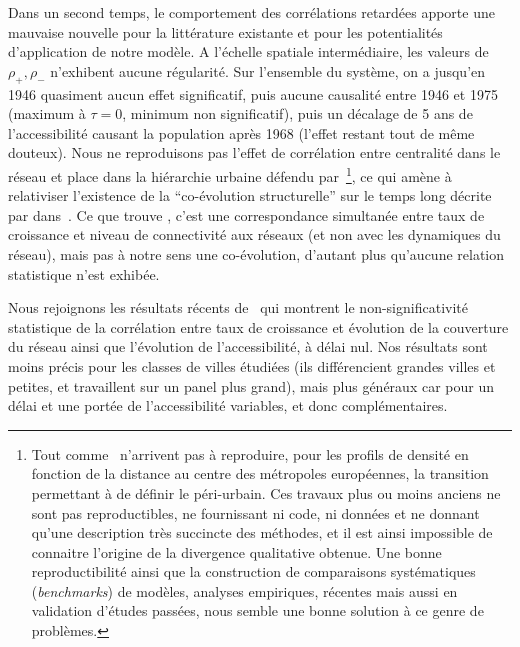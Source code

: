 Dans un second temps, le comportement des corrélations retardées apporte une mauvaise nouvelle pour la littérature existante et pour les potentialités d'application de notre modèle. A l'échelle spatiale intermédiaire, les valeurs de $\rho_+,\rho_-$ n'exhibent aucune régularité. Sur l'ensemble du système, on a jusqu'en 1946 quasiment aucun effet significatif, puis aucune causalité entre 1946 et 1975 (maximum à $\tau = 0$, minimum non significatif), puis un décalage de 5 ans de l'accessibilité causant la population après 1968 (l'effet restant tout de même douteux). Nous ne reproduisons pas l'effet de corrélation entre centralité dans le réseau et place dans la hiérarchie urbaine défendu par~\cite{bretagnolle2003vitesse}\footnote{Tout comme~\cite{lemoy2017scaling} n'arrivent pas à reproduire, pour les profils de densité en fonction de la distance au centre des métropoles européennes, la transition permettant à \cite{guerois2008built} de définir le péri-urbain. Ces travaux plus ou moins anciens ne sont pas reproductibles, ne fournissant ni code, ni données et ne donnant qu'une description très succincte des méthodes, et il est ainsi impossible de connaitre l'origine de la divergence qualitative obtenue. Une bonne reproductibilité ainsi que la construction de comparaisons systématiques (\emph{benchmarks}) de modèles, analyses empiriques, récentes mais aussi en validation d'études passées, nous semble une bonne solution à ce genre de problèmes.}, ce qui amène à relativiser l'existence de la ``co-évolution structurelle'' sur le temps long décrite par  dans~\cite{espacegeo2014effets}. Ce que trouve \cite{bretagnolle2003vitesse}, c'est une correspondance simultanée entre taux de croissance et niveau de connectivité aux réseaux (et non avec les dynamiques du réseau), mais pas à notre sens une co-évolution, d'autant plus qu'aucune relation statistique n'est exhibée.


Nous rejoignons les résultats récents de~\cite{mimeur:hal-01616746} qui montrent le non-significativité statistique de la corrélation entre taux de croissance et évolution de la couverture du réseau ainsi que l'évolution de l'accessibilité, à délai nul. Nos résultats sont moins précis pour les classes de villes étudiées (ils différencient grandes villes et petites, et travaillent sur un panel plus grand), mais plus généraux car pour un délai et une portée de l'accessibilité variables, et donc complémentaires.






